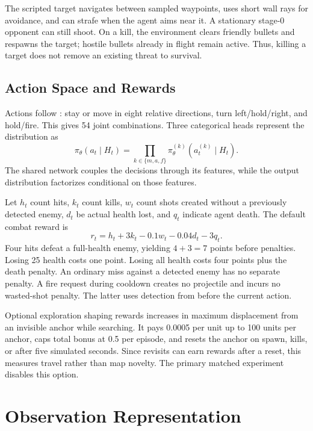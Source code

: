 \documentclass[conference]{IEEEtran}
\newcommand{\code}[1]{\texttt{\detokenize{#1}}}
\begin{document}
The scripted target navigates between sampled waypoints, uses short wall rays for avoidance, and can strafe when the agent aims near it. A stationary stage-0 opponent can still shoot. On a kill, the environment clears friendly bullets and respawns the target; hostile bullets already in flight remain active. Thus, killing a target does not remove an existing threat to survival.

\subsection{Action Space and Rewards}
Actions follow \code{MultiDiscrete([9,3,2])}: stay or move in eight relative directions, turn left/hold/right, and hold/fire. This gives 54 joint combinations. Three categorical heads represent the distribution as
\begin{equation}
\pi_\theta(a_t\mid H_t)=\prod_{k\in\{m,a,f\}}\pi_\theta^{(k)}(a_t^{(k)}\mid H_t).
\end{equation}
The shared network couples the decisions through its features, while the output distribution factorizes conditional on those features.

Let $h_t$ count hits, $k_t$ count kills, $w_t$ count shots created without a previously detected enemy, $d_t$ be actual health lost, and $q_t$ indicate agent death. The default combat reward is
\begin{equation}
r_t=h_t+3k_t-0.1w_t-0.04d_t-3q_t.
\label{eq:reward}
\end{equation}
Four hits defeat a full-health enemy, yielding $4+3=7$ points before penalties. Losing 25 health costs one point. Losing all health costs four points plus the death penalty. An ordinary miss against a detected enemy has no separate penalty. A fire request during cooldown creates no projectile and incurs no wasted-shot penalty. The latter uses detection from before the current action.

Optional exploration shaping rewards increases in maximum displacement from an invisible anchor while searching. It pays 0.0005 per unit up to 100 units per anchor, caps total bonus at 0.5 per episode, and resets the anchor on spawn, kills, or after five simulated seconds. Since revisits can earn rewards after a reset, this measures travel rather than map novelty. The primary matched experiment disables this option.

\section{Observation Representation}
\end{document}
